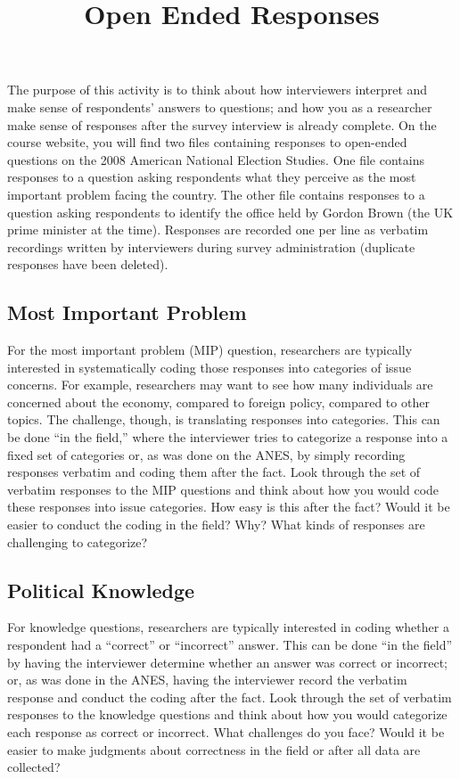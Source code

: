 \documentclass[12pt, a4]{article}
\title{Open Ended Responses\vspace{-2em}}
\author{}
\date{}
\begin{document}
\maketitle

\noindent The purpose of this activity is to think about how interviewers interpret and make sense of respondents' answers to questions; and how you as a researcher make sense of responses after the survey interview is already complete. On the course website, you will find two files containing responses to open-ended questions on the 2008 American National Election Studies. One file contains responses to a question asking respondents what they perceive as the most important problem facing the country. The other file contains responses to a question asking respondents to identify the office held by Gordon Brown (the UK prime minister at the time). Responses are recorded one per line as verbatim recordings written by interviewers during survey administration (duplicate responses have been deleted).

\subsection*{Most Important Problem}

\noindent For the most important problem (MIP) question, researchers are typically interested in systematically coding those responses into categories of issue concerns. For example, researchers may want to see how many individuals are concerned about the economy, compared to foreign policy, compared to other topics. The challenge, though, is translating responses into categories. This can be done ``in the field,'' where the interviewer tries to categorize a response into a fixed set of categories or, as was done on the ANES, by simply recording responses verbatim and coding them after the fact. Look through the set of verbatim responses to the MIP questions and think about how you would code these responses into issue categories. How easy is this after the fact? Would it be easier to conduct the coding in the field? Why? What kinds of responses are challenging to categorize?

\subsection*{Political Knowledge}

\noindent For knowledge questions, researchers are typically interested in coding whether a respondent had a ``correct'' or ``incorrect'' answer. This can be done ``in the field'' by having the interviewer determine whether an answer was correct or incorrect; or, as was done in the ANES, having the interviewer record the verbatim response and conduct the coding after the fact. Look through the set of verbatim responses to the knowledge questions and think about how you would categorize each response as correct or incorrect. What challenges do you face? Would it be easier to make judgments about correctness in the field or after all data are collected?
\end{document}
